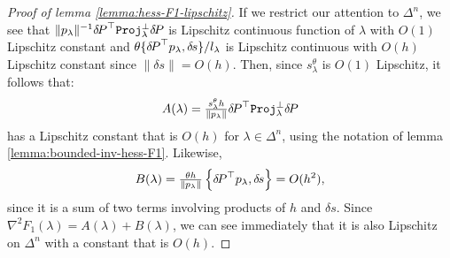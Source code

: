 \documentclass[smallcondensed]{svjour3}
\begin{document}
\begin{proof}[Proof of lemma \ref{lemma:hess-F1-lipschitz}]
  If we restrict our attention to $\Delta^n$, we see that
  $\|p_\lambda\|^{-1} {\delta \hspace{-0.14em} P}^\top \mathtt{Proj}_\lambda^\perp {\delta \hspace{-0.14em} P}$ is
  Lipschitz continuous function of $\lambda$ with $O(1)$ Lipschitz
  constant and $\theta \{{{\delta \hspace{-0.14em} P}}^\top p_\lambda, {\delta \hspace{-0.1em} s}\} /l_{\lambda}$
  is Lipschitz continuous with $O(h)$ Lipschitz constant since
  $\|\delta s\| = O(h)$. Then, since $s^\theta_\lambda$ is $O(1)$
  Lipschitz, it follows that:
  \begin{equation}
    A(\lambda) = \tfrac{s^\theta_\lambda h}{\|p_\lambda\|} {\delta \hspace{-0.14em} P}^\top
    \mathtt{Proj}^\perp_\lambda {\delta \hspace{-0.14em} P}
  \end{equation}
  has a Lipschitz constant that is $O(h)$ for $\lambda \in \Delta^n$,
  using the notation of lemma
  \ref{lemma:bounded-inv-hess-F1}. Likewise,
  \begin{equation}
    B(\lambda) = \tfrac{\theta h}{\|p_\lambda\|} \left\{{\delta \hspace{-0.14em} P}^\top
      p_\lambda, {\delta \hspace{-0.1em} s}\right\} = O(h^2),
  \end{equation}
  since it is a sum of two terms involving products of $h$ and
  $\delta s$. Since $\nabla^2 F_1(\lambda) = A(\lambda) + B(\lambda)$,
  we can see immediately that it is also Lipschitz on $\Delta^n$ with
  a constant that is $O(h)$.
\end{proof}
\end{document}
